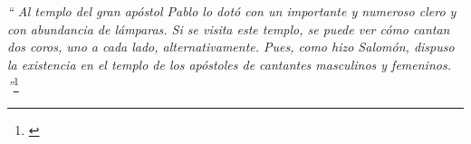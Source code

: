 \textit{``
	Al templo del gran apóstol Pablo lo dotó con un importante y
	numeroso clero y con abundancia de lámparas. Si se visita este
	templo, se puede ver cómo cantan dos coros, uno a cada lado,
	alternativamente. Pues, como hizo Salomón, dispuso la existencia
	en el templo de los apóstoles de cantantes masculinos y femeninos.
	''}\footnote{\cite[p.~608]{alexiadaXV}}


































